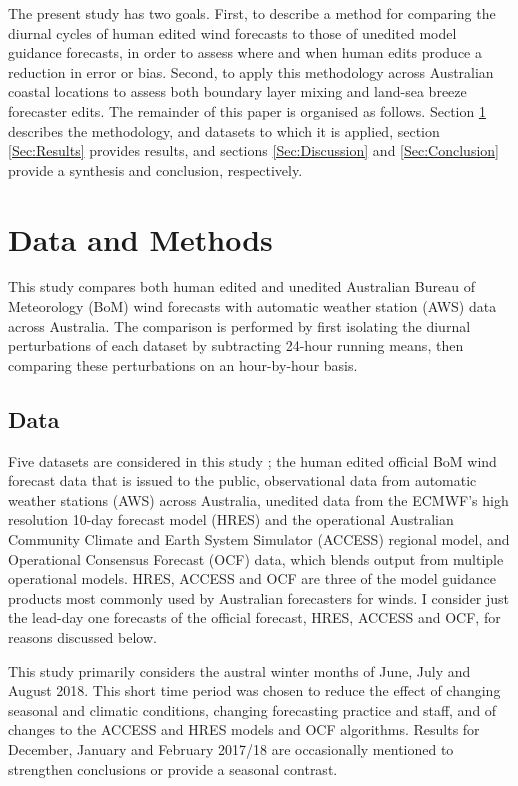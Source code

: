 \documentclass[twocol]{ametsoc}
\begin{document}
The present study has two goals. First, to describe a method for comparing the diurnal cycles of human edited wind forecasts to those of unedited model guidance forecasts, in order to assess where and when human edits produce a reduction in error or bias. Second, to apply this methodology across Australian coastal locations to assess both boundary layer mixing and land-sea breeze forecaster edits. The remainder of this paper is organised as follows. Section \ref{Sec:Methods} describes the methodology, and datasets to which it is applied, section \ref{Sec:Results} provides results, and sections \ref{Sec:Discussion} and \ref{Sec:Conclusion} provide a synthesis and conclusion, respectively.

\section{Data and Methods} \label{Sec:Methods}
This study compares both human edited and unedited Australian Bureau of Meteorology (BoM) wind forecasts with automatic weather station (AWS) data across Australia. The comparison is performed by first isolating the diurnal perturbations of each dataset by subtracting 24-hour running means, then comparing these perturbations on an hour-by-hour basis.

\subsection{Data}
Five datasets are considered in this study \citep{shortData19}; the human edited official BoM wind forecast data that is issued to the public, observational data from automatic weather stations (AWS) across Australia, unedited data from the ECMWF's high resolution 10-day forecast model (HRES) and the operational Australian Community Climate and Earth System Simulator (ACCESS) regional model, and Operational Consensus Forecast (OCF) data, which blends output from multiple operational models. HRES, ACCESS and OCF are three of the model guidance products most commonly used by Australian forecasters for winds. I consider just the lead-day one forecasts of the official forecast, HRES, ACCESS and OCF, for reasons discussed below. 

This study primarily considers the austral winter months of June, July and August 2018. This short time period was chosen to reduce the effect of changing seasonal and climatic conditions, changing forecasting practice and staff, and of changes to the ACCESS and HRES models and OCF algorithms. Results for December, January and February 2017/18 are occasionally mentioned to strengthen conclusions or provide a seasonal contrast. 
\end{document}
